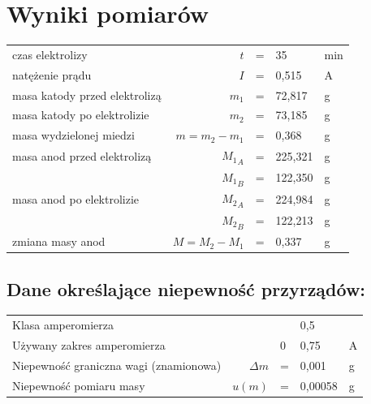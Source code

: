 \documentclass[a4paper,11pt]{article}
\begin{document}
\section{Wyniki pomiarów}
\begin{center}
\begin{tabular}{lrlll}
czas elektrolizy               & $t$ & = & 35 & min  \\ 
natężenie prądu               &  $I$ & = & 0,515 & A \\ 
masa katody przed elektrolizą &  $m_1$ & = & 72,817 & g \\ 
masa katody po elektrolizie  &   $m_2$ & = & 73,185 & g\\ 
masa wydzielonej miedzi       &  $m = m_2 - m_1$& = & 0,368 & g \\ 
masa anod przed elektrolizą   &   ${M_1}_{A}$ & = &225,321 & g\\ 
  &   ${M_1}_{B}$ & = &122,350 & g\\ 
masa anod po elektrolizie     &   ${M_2}_{A}$ & = &224,984 & g\\
  &   ${M_2}_{B}$ & = &122,213 & g\\  
zmiana masy anod               &  $M = M_2 - M_1$& = & 0,337 & g \\  
\end{tabular} 
\end{center}

\subsection*{Dane określające niepewność przyrządów:}
\begin{center}
\begin{tabular}{lrlll}
Klasa amperomierza              & &  & 0,5 &   \\ 
Używany zakres amperomierza               &   & 0 & 0,75 & A \\ 
Niepewność graniczna wagi (znamionowa)&  $\Delta m$ & = & 0,001 & g \\ 
Niepewność pomiaru masy &   $u(m)$& = & 0,00058 & g\\  
\end{tabular} 
\end{center}
\end{document}
